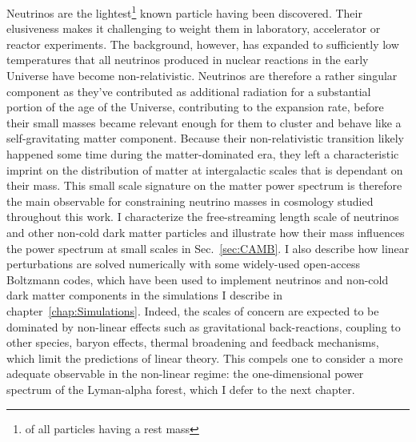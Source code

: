 \begin{intro}
Neutrinos are the lightest\footnote{of all particles having a rest mass} known particle having been discovered. Their elusiveness makes it challenging to weight them in laboratory, accelerator or reactor experiments. The background, however, has expanded to sufficiently low temperatures that all neutrinos produced in nuclear reactions in the early Universe have become non-relativistic. Neutrinos are therefore a rather singular component as they've contributed as additional radiation for a substantial portion of the age of the Universe, contributing to the expansion rate, before their small masses became relevant enough for them to cluster and behave like a self-gravitating matter component. Because their non-relativistic transition likely happened some time during the matter-dominated era, they left a characteristic imprint on the distribution of matter at intergalactic scales that is dependant on their mass. This small scale signature on the matter power spectrum is therefore the main observable for constraining neutrino masses in cosmology studied throughout this work. I characterize the free-streaming length scale of neutrinos and other non-cold dark matter particles and illustrate how their mass influences the power spectrum at small scales in Sec.~\ref{sec:CAMB}. I also describe how linear perturbations are solved numerically with some widely-used open-access Boltzmann codes, which have been used to implement neutrinos and non-cold dark matter components in the simulations I describe in chapter~\ref{chap:Simulations}. Indeed, the scales of concern are expected to be dominated by non-linear effects such as gravitational back-reactions, coupling to other species, baryon effects, thermal broadening and feedback mechanisms, which limit the predictions of linear theory. This compels one to consider a more adequate observable in the non-linear regime: the one-dimensional power spectrum of the Lyman-alpha forest, which I defer to the next chapter.
\end{intro}

